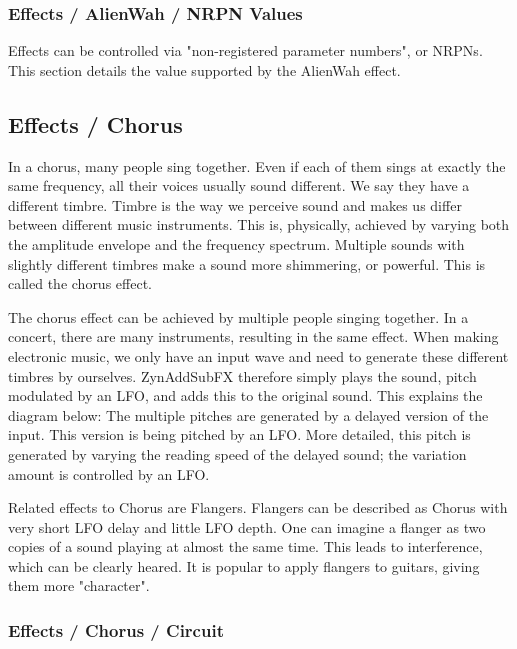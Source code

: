 \subsubsection{Effects / AlienWah / NRPN Values}
\label{subsubsec:effects_edit_alienwah_nrpn}

Effects can be controlled via "non-registered parameter numbers", or NRPNs.
This section details the value supported by the AlienWah effect.

\subsection{Effects / Chorus}
\label{subsec:effects_edit_chorus}

   In a chorus, many people sing together. Even if each of them sings at
   exactly the same frequency, all their voices usually sound different. We
   say they have a different timbre. Timbre is the way we perceive sound and
   makes us differ between different music instruments. This is, physically,
   achieved by varying both the amplitude envelope and the frequency
   spectrum. Multiple sounds with slightly different timbres make a sound
   more shimmering, or powerful. This is called the chorus effect.

   The chorus effect can be achieved by multiple people singing together. In
   a concert, there are many instruments, resulting in the same effect. When
   making electronic music, we only have an input wave and need to generate
   these different timbres by ourselves. ZynAddSubFX therefore simply plays
   the sound, pitch modulated by an LFO, and adds this to the original sound.
   This explains the diagram below: The multiple pitches are generated by a
   delayed version of the input. This version is being pitched by an LFO.
   More detailed, this pitch is generated by varying the reading speed of
   the delayed sound; the variation amount is controlled by an LFO.

   Related effects to Chorus are Flangers. Flangers can be described as
   Chorus with very short LFO delay and little LFO depth. One can imagine a
   flanger as two copies of a sound playing at almost the same time. This
   leads to interference, which can be clearly heared. It is popular to apply
   flangers to guitars, giving them more "character".

\subsubsection{Effects / Chorus / Circuit}
\label{subsubsec:effects_edit_chorus_circuit}

